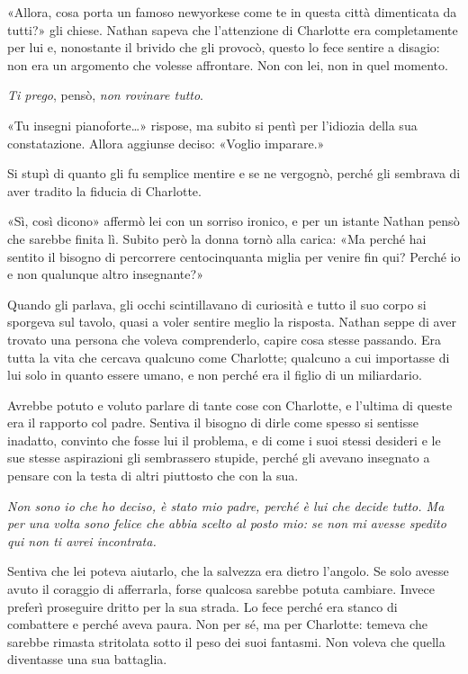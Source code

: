 \documentclass[a4paper,oneside,11pt]{memoir}
\begin{document}
«Allora, cosa porta un famoso newyorkese come te in questa città dimenticata da
tutti?» gli chiese. Nathan sapeva che l'attenzione di Charlotte era
completamente per lui e, nonostante il brivido che gli provocò, questo lo fece
sentire a disagio: non era un argomento che volesse affrontare. Non con lei, non
in quel momento.

\emph{Ti prego}, pensò, \emph{non rovinare tutto}.

«Tu insegni pianoforte\dots» rispose, ma subito si pentì per l'idiozia della
sua constatazione. Allora aggiunse deciso: «Voglio imparare.»

Si stupì di quanto gli fu semplice mentire e se ne vergognò, perché gli sembrava
di aver tradito la fiducia di Charlotte.

«Sì, così dicono» affermò lei con un sorriso ironico, e per un istante Nathan
pensò che sarebbe finita lì. Subito però la donna tornò alla carica: «Ma perché
hai sentito il bisogno di percorrere centocinquanta miglia per venire fin qui?
Perché io e non qualunque altro insegnante?»

Quando gli parlava, gli occhi scintillavano di curiosità e tutto il suo corpo si
sporgeva sul tavolo, quasi a voler sentire meglio la risposta. Nathan seppe di
aver trovato una persona che voleva comprenderlo, capire cosa stesse passando.
Era tutta la vita che cercava qualcuno come Charlotte; qualcuno a cui importasse
di lui solo in quanto essere umano, e non perché era il figlio di un
miliardario.

Avrebbe potuto e voluto parlare di tante cose con Charlotte, e l'ultima di
queste era il rapporto col padre. Sentiva il bisogno di dirle come spesso si
sentisse inadatto, convinto che fosse lui il problema, e di come i suoi stessi
desideri e le sue stesse aspirazioni gli sembrassero stupide, perché gli avevano
insegnato a pensare con la testa di altri piuttosto che con la sua.

\emph{Non sono io che ho deciso, è stato mio padre, perché è lui che decide
tutto. Ma per una volta sono felice che abbia scelto al posto mio: se non mi
avesse spedito qui non ti avrei incontrata.}

Sentiva che lei poteva aiutarlo, che la salvezza era dietro l'angolo. Se solo
avesse avuto il coraggio di afferrarla, forse qualcosa sarebbe potuta cambiare.
Invece preferì proseguire dritto per la sua strada. Lo fece perché era stanco di
combattere e perché aveva paura. Non per sé, ma per Charlotte: temeva che
sarebbe rimasta stritolata sotto il peso dei suoi fantasmi. Non voleva che
quella diventasse una sua battaglia.
\end{document}
